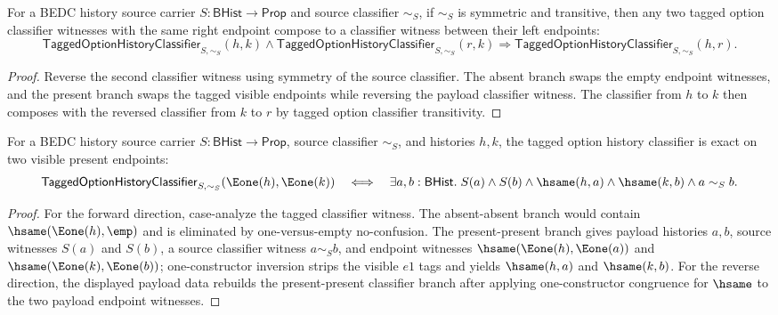 \begin{theorem}
\label{thm:tagged-option-history-classifier-right-confluence}
For a BEDC history source carrier $S:\mathsf{BHist}\to\mathsf{Prop}$ and source
classifier $\sim_S$, if $\sim_S$ is symmetric and transitive, then any two
tagged option classifier witnesses with the same right endpoint compose to a
classifier witness between their left endpoints:
$$
\mathsf{TaggedOptionHistoryClassifier}_{S,\sim_S}(h,k)\land
\mathsf{TaggedOptionHistoryClassifier}_{S,\sim_S}(r,k)
\Longrightarrow
\mathsf{TaggedOptionHistoryClassifier}_{S,\sim_S}(h,r).
$$
\end{theorem}
\begin{proof}
Reverse the second classifier witness using symmetry of the source classifier.
The absent branch swaps the empty endpoint witnesses, and the present branch
swaps the tagged visible endpoints while reversing the payload classifier
witness. The classifier from $h$ to $k$ then composes with the reversed
classifier from $k$ to $r$ by tagged option classifier transitivity.
\end{proof}

\begin{theorem}
\label{thm:tagged-option-history-present-present-exactness}
For a BEDC history source carrier $S:\mathsf{BHist}\to\mathsf{Prop}$, source classifier $\sim_S$, and histories $h,k$, the tagged option history classifier is exact on two visible present endpoints:
$$
\mathsf{TaggedOptionHistoryClassifier}_{S,\sim_S}(\Eone(h),\Eone(k))
\quad\Longleftrightarrow\quad
\exists a,b:\mathsf{BHist}.\; S(a)\land S(b)\land \hsame(h,a)\land \hsame(k,b)\land a\sim_S b.
$$
\end{theorem}
\begin{proof}
For the forward direction, case-analyze the tagged classifier witness. The absent-absent branch would contain $\hsame(\Eone(h),\emp)$ and is eliminated by one-versus-empty no-confusion. The present-present branch gives payload histories $a,b$, source witnesses $S(a)$ and $S(b)$, a source classifier witness $a\sim_S b$, and endpoint witnesses $\hsame(\Eone(h),\Eone(a))$ and $\hsame(\Eone(k),\Eone(b))$; one-constructor inversion strips the visible $e1$ tags and yields $\hsame(h,a)$ and $\hsame(k,b)$. For the reverse direction, the displayed payload data rebuilds the present-present classifier branch after applying one-constructor congruence for $\hsame$ to the two payload endpoint witnesses.
\end{proof}


